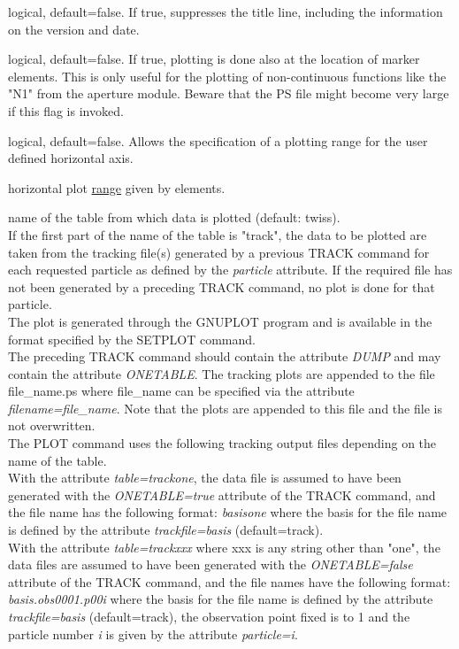 \begin{madlist}
    logical, default=false. If true, suppresses the title
     line, including the information on the version and date.  

    logical, default=false. If true, plotting is done
     also at the location of marker elements. This is only useful for
     the plotting of non-continuous functions like the "N1" from the
     aperture module. Beware that the PS file might become very large if
     this flag is invoked.
  
    logical, default=false. Allows the specification
     of a plotting range for the user defined horizontal axis.   

    horizontal plot
     \href{../Introduction/ranges.html}{range} given by elements.  

    name of the table from which data is plotted (default:
     twiss). \\ 
     If the first part of the name of the table is "track", the
     data to be plotted are taken from the tracking file(s) generated by
     a previous TRACK command for each requested particle as defined by
     the \textit{particle} attribute. If the required file has not been
     generated by a preceding TRACK command, no plot is done for that
     particle. \\  
     The plot is generated through the GNUPLOT program and is available
     in the format specified by the SETPLOT command. \\ 
     The preceding TRACK command should contain the attribute \textit{DUMP}
     and may contain the attribute \textit{ONETABLE}. The tracking plots
     are appended to the file file\_name.ps where file\_name can be
     specified via the attribute \textit{filename=file\_name}. Note that
     the plots are appended to this file and the file is not
     overwritten. \\
     The PLOT command uses the following tracking output files depending on
     the name of the table.\\  
     With the attribute \textit{table=trackone}, the data file is assumed
     to have been generated with the \textit{ONETABLE=true} attribute of
     the TRACK command, and the file name has the following format: 
     \textit{basisone} where the basis for the file name is defined by the
     attribute \textit{trackfile=basis} (default=track).\\
     With the attribute \textit{table=trackxxx} where xxx is any string
     other than "one", the data files are assumed to have been generated
     with the \textit{ONETABLE=false} attribute of the TRACK command, and
     the file names have the following format: \textit{basis.obs0001.p00i}
     where the basis for the file name is defined by the attribute
     \textit{trackfile=basis} (default=track), the observation point fixed
     is to 1 and the particle number \textit{i} is given by the attribute
     \textit{particle=i}.
 

\end{madlist}
